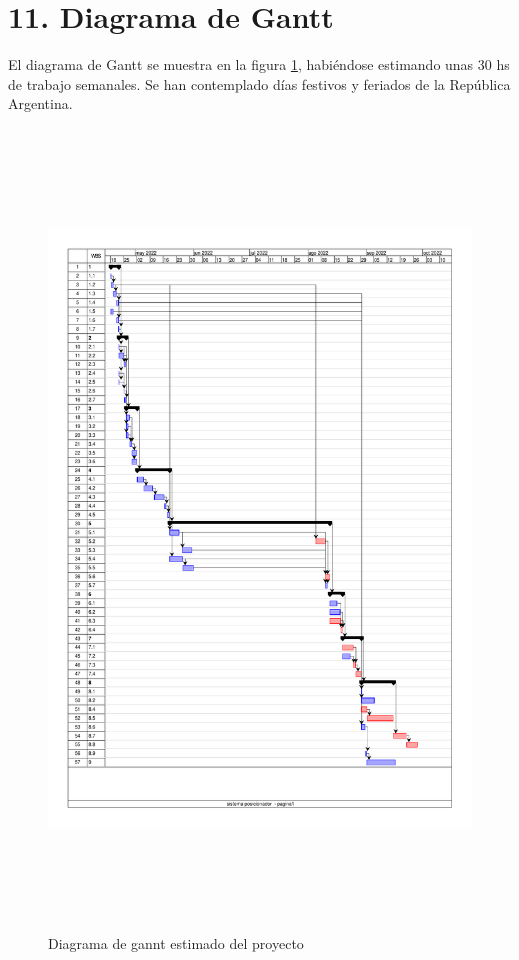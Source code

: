 \documentclass[11pt, %
codirector, %
]{charter}
\begin{document}
\section{11. Diagrama de Gantt}
\label{sec:gantt}
El diagrama de Gantt se muestra en la figura \ref{fig:diaGANTT}, habiéndose estimando unas 30 hs de trabajo semanales. Se han contemplado días festivos y feriados de la República Argentina. 


\begin{figure}[H]
	\includegraphics[width = \textwidth, height = 21.2cm,trim={0 3cm 0  0.1cm},clip ]{./Figuras/AonGantt/gannt_poss.pdf}
	\caption{Diagrama de gannt estimado del proyecto}
	\label{fig:diaGANTT}
\end{figure}
\end{document}
